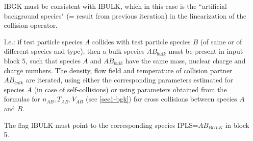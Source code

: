 \begin{description}
        IBGK must be consistent with IBULK, which in this case is the ``artificial
        background species" (= result from previous iteration) in the linearization of
        the collision operator.

        I.e.: if test particle species $A$ collides with test particle species $B$ (of
        same or of different species and type), then a bulk species $AB_{bulk}$ must be
        present in input block 5, such that species $A$ and $AB_{bulk}$ have the same
        mass, nuclear charge and charge numbers.
        The density, flow field and temperature of collision partner $AB_{bulk}$ are
        iterated, using either the corresponding parameters estimated for species $A$
        (in case of self-collisions) or using parameters obtained from the formulas for
        $n_{AB}, T_{AB}, V_{AB}$ (see \cref{sec1-bgk}) for cross collisions between
        species $A$ and $B$.

        The flag IBULK must point to the corresponding species IPLS=$AB_{BULK}$ in
        block 5.


\end{description}
